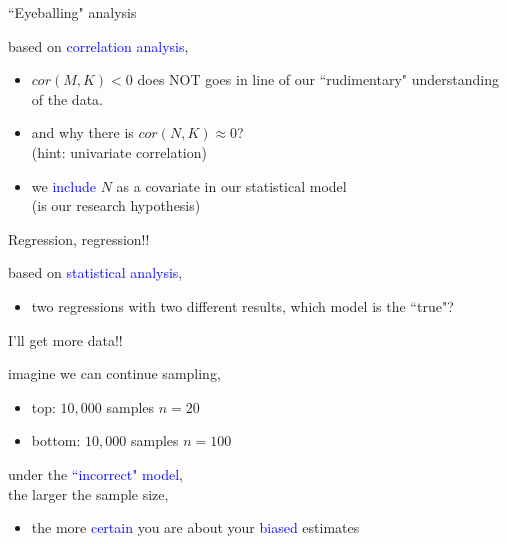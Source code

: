 %
%
\begin{lhframe}[rhgraphic={\texttt{[image: pipe3\_panel.pdf]}}]
	{``Eyeballing" analysis}
	
	based on \textcolor{blue}{correlation analysis},
	\begin{itemize}
		\item $cor(M, K)<0$ does NOT goes in line of our ``rudimentary" understanding of the data.
		\item and why there is $cor(N, K) \approx 0$? \\
		{\small (hint: univariate correlation)}
		\item we \textcolor{blue}{include} $N$ as a covariate in our statistical model \\
		{\small (is our research hypothesis)}
	\end{itemize}
\end{lhframe}
%
%
\begin{lhframe}[rhgraphic={\texttt{[image: pipe3\_reg.png]}}]
	{Regression, regression!!}
	
	based on \textcolor{blue}{statistical analysis},
	\begin{itemize}
		\item two regressions with two different results, which model is the ``true"?
	\end{itemize}
\end{lhframe}
%
%
\begin{lhframe}[rhgraphic={\texttt{[image: pipe3\_samplesize.pdf]}}]
	{I'll get more data!!}
	
	imagine we can continue sampling,
	\begin{itemize}
		\item top: $10,000$ samples $n=20$
		\item bottom: $10,000$ samples $n=100$
	\end{itemize}
	
	under the \textcolor{blue}{``incorrect" model}, \\
	the larger the sample size,
	\begin{itemize}
		\item the more \textcolor{blue}{certain} you are about your \textcolor{blue}{biased} estimates
	\end{itemize}
\end{lhframe}
%
%
